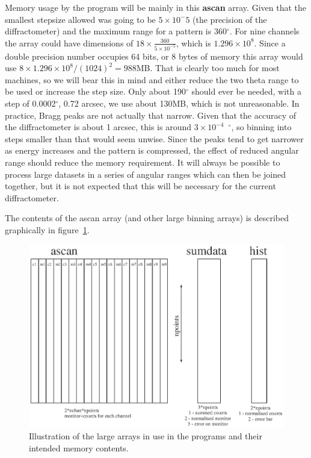 \documentclass[10pt,a4paper,notitlepage]{article}
\newcommand{\var}[1]{\textbf{\textsf{#1}}} %
\begin{document}
Memory usage by the program will be mainly in this \var{ascan} array.
Given that the smallest stepsize allowed was going to be $5\times10^-5$ (the 
precision of the diffractometer)
and the maximum range for a pattern is 360$^{\circ}$. 
For nine channels the array could have dimensions of 
$18\times\frac{360}{5\times10^{-5}}$, which is $1.296\times10^8$. 
Since a double precision number occupies 64 bits, or 8 bytes of memory
this array would use $8\times1.296\times10^8/(1024)^{2} = 988$MB. 
That is clearly too much for most machines, so we will bear this in
mind and either reduce the two theta range to be used or increase the step 
size. Only about 190$^\circ$ should ever be needed, with a step of 
0.0002$^\circ$, 0.72 arcsec, we use about 130MB, which is not unreasonable.
In practice, Bragg peaks are not actually that narrow.
Given that the accuracy of the diffractometer is about 1 arcsec, this
is around $3\times10^{-4}$~$^\circ$, so binning into steps smaller than that
would seem unwise.
Since the peaks tend to get narrower as energy increases and the pattern is
compressed, the effect of reduced angular range should reduce the memory
requirement.
It will always be possible to process large datasets in a series of angular
ranges which can then be joined together, but it is not expected that this
will be necessary for the current diffractometer.

The contents of the ascan array (and other large binning arrays) is described
graphically in figure~\ref{fig:bigarrays}. 

\begin{figure}[tb]
  \centering
  \includegraphics{bigarrays.eps}
  \caption{Illustration of the large arrays in use in the programs
  and their intended memory contents.}
  \label{fig:bigarrays}
\end{figure}
\end{document}
